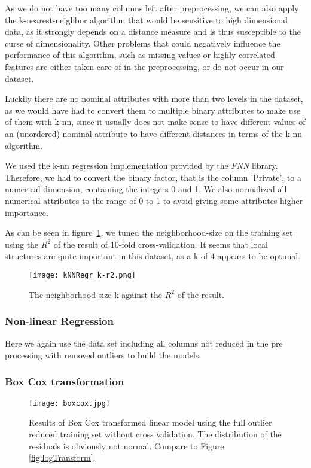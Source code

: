 \documentclass[a4paper]{article}
\begin{document}
As we do not have too many columns left after preprocessing, we can also apply the k-nearest-neighbor algorithm that would be sensitive to high dimensional data, as it strongly depends on a distance measure and is thus susceptible to the curse of dimensionality. Other problems that could negatively influence the performance of this algorithm, such as missing values or highly correlated features are either taken care of in the preprocessing, or do not occur in our dataset.

Luckily there are no nominal attributes with more than two levels in the dataset, as we would have had to convert them to multiple binary attributes to make use of them with k-nn, since it usually does not make sense to have different values of an (unordered) nominal attribute to have different distances in terms of the k-nn algorithm.

We used the k-nn regression implementation provided by the \textit{FNN} library. Therefore, we had to convert the binary factor, that is the column 'Private', to a numerical dimension, containing the integers 0 and 1. We also normalized all numerical attributes to the range of 0 to 1 to avoid giving some attributes higher importance. 

As can be seen in figure~\ref{fig:knnReg}, we tuned the neighborhood-size on the training set using the $R^2$ of the result of 10-fold cross-validation. It seems that local structures are quite important in this dataset, as a k of 4 appears to be optimal. 
\begin{figure}[H]
	\centering
	\texttt{[image: kNNRegr\_k-r2.png]}
	\caption{\label{fig:knnReg} The neighborhood size k against the $R^2$ of the result.
    }
\end{figure}

\subsubsection{Non-linear Regression}
Here we again use the data set including all columns not reduced in the pre processing with removed outliers to build the models.

\subsubsection{Box Cox transformation}

  \begin{figure}[H]
  	\centering
  	\texttt{[image: boxcox.jpg]}
  	\caption{\label{fig:boxcox} Results of Box Cox transformed linear model using the full outlier reduced training set without cross validation. The distribution of the residuals is obviously not normal. Compare to Figure \ref{fig:logTransform}.
      }
  \end{figure}
\end{document}
